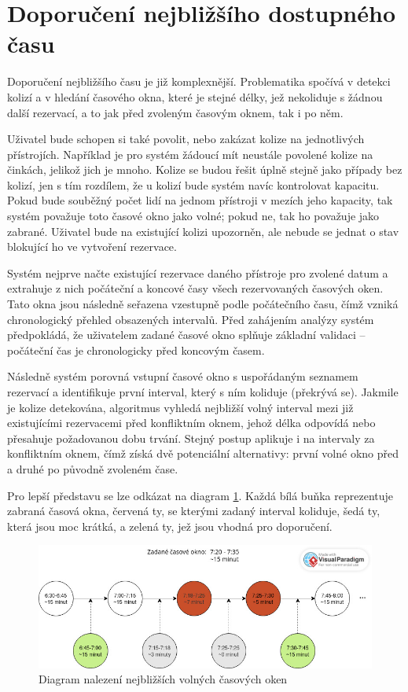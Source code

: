 \section{Doporučení nejbližšího dostupného času}
Doporučení nejbližšího času je již komplexnější. Problematika spočívá v detekci kolizí a v hledání časového okna, které je stejné délky, jež nekoliduje s žádnou další rezervací, a to jak před zvoleným časovým oknem, tak i po něm.

Uživatel bude schopen si také povolit, nebo zakázat kolize na jednotlivých přístrojích. Například je pro systém žádoucí mít neustále povolené kolize na činkách, jelikož jich je mnoho. Kolize se budou řešit úplně stejně jako případy bez kolizí, jen s tím rozdílem, že u kolizí bude systém navíc kontrolovat kapacitu. Pokud bude souběžný počet lidí na jednom přístroji v mezích jeho kapacity, tak systém považuje toto časové okno jako volné; pokud ne, tak ho považuje jako zabrané. Uživatel bude na existující kolizi upozorněn, ale nebude se jednat o stav blokující ho ve vytvoření rezervace.

Systém nejprve načte existující rezervace daného přístroje pro zvolené datum a extrahuje z nich počáteční a koncové časy všech rezervovaných časových oken. Tato okna jsou následně seřazena vzestupně podle počátečního času, čímž vzniká chronologický přehled obsazených intervalů. Před zahájením analýzy systém předpokládá, že uživatelem zadané časové okno splňuje základní validaci – počáteční čas je chronologicky před koncovým časem.

Následně systém porovná vstupní časové okno s uspořádaným seznamem rezervací a identifikuje první interval, který s ním koliduje (překrývá se). Jakmile je kolize detekována, algoritmus vyhledá nejbližší volný interval mezi již existujícími rezervacemi před konfliktním oknem, jehož délka odpovídá nebo přesahuje požadovanou dobu trvání. Stejný postup aplikuje i na intervaly za konfliktním oknem, čímž získá dvě potenciální alternativy: první volné okno před a druhé po původně zvoleném čase.

Pro lepší představu se lze odkázat na diagram \ref{fig:ReservationTimeSuggestionDiagram}. Každá bílá buňka reprezentuje zabraná časová okna, červená ty, se kterými zadaný interval koliduje, šedá ty, která jsou moc krátká, a zelená ty, jež jsou vhodná pro doporučení. 

\begin{figure}
    \centering
    \includegraphics[width=1\textwidth]{Figures/time_suggestion_diagram.jpg}
    \caption{Diagram nalezení nejbližších volných časových oken}
    \label{fig:ReservationTimeSuggestionDiagram}
\end{figure}


